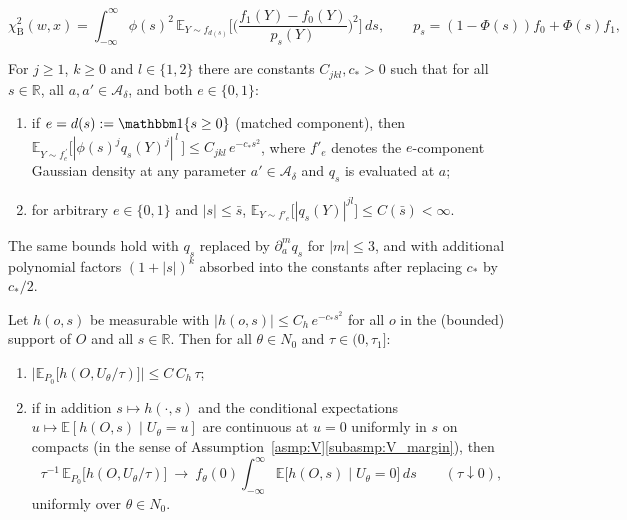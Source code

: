 \documentclass[10pt,a4paper]{amsart}
\newcommand{\E}{\mathbb{E}}
\newcommand{\R}{\mathbb{R}}
\begin{document}
\begin{equation}
\chi^2_{\mathrm B}(w,x)=\int_{-\infty}^{\infty}\phi(s)^2\,
\E_{Y\sim f_{d(s)}}\Bigg[\bigg(\frac{f_1(Y)-f_0(Y)}{p_s(Y)}\bigg)^{\!2}\Bigg]\,ds,
\qquad
p_s=(1-\Phi(s))f_0+\Phi(s)f_1,
\label{eq:chisq_weight}
\end{equation}

\begin{lemma}
\label{lem:gate_factor_moments}
For $j\ge1$, $k\ge0$ and $l\in\{1,2\}$ there are constants $C_{jkl},c_*>0$ such that for all $s\in\R$, all $a,a'\in\mathcal A_\delta$, and both $e\in\{0,1\}$:
\begin{enumerate}[label=(\roman*),nosep]
\item\label{gfm:matched} if $e=d(s):=\mathbbm 1\{s\ge0\}$ (matched component), then
$\E_{Y\sim f^{\,\prime}_{e}}\big[|\phi(s)^jq_s(Y)^j|^{\,l}\,\big]\le C_{jkl}\,e^{-c_*s^2}$,
where $f'_e$ denotes the $e$-component Gaussian density at any parameter $a'\in\mathcal A_\delta$ and $q_s$ is evaluated at $a$;
\item\label{gfm:mismatched} for arbitrary $e\in\{0,1\}$ and $|s|\le\bar s$,
$\E_{Y\sim f'_{e}}\big[|q_s(Y)|^{jl}\big]\le C(\bar s)<\infty$.
\end{enumerate}
The same bounds hold with $q_s$ replaced by $\partial_a^mq_s$ for $|m|\le3$, and with additional polynomial factors $(1+|s|)^k$ absorbed into the constants after replacing $c_*$ by $c_*/2$.
\end{lemma}

\begin{lemma}
\label{lem:boundary_layer_integration}
Let $h(o,s)$ be measurable with $|h(o,s)|\le C_h\,e^{-c_*s^2}$ for all $o$ in the (bounded) support of $O$ and all $s\in\R$. Then for all $\theta\in N_0$ and $\tau\in(0,\tau_1]$:
\begin{enumerate}[label=(\roman*),nosep]
\item $\big|\E_{P_0}\big[h(O,U_\theta/\tau)\big]\big|\le C\,C_h\,\tau$;
\item if in addition $s\mapsto h(\cdot,s)$ and the conditional expectations $u\mapsto\E[h(O,s)\mid U_\theta=u]$ are continuous at $u=0$ uniformly in $s$ on compacts (in the sense of Assumption~\ref{asmp:V}\ref{subasmp:V_margin}), then
\[
\tau^{-1}\,\E_{P_0}\big[h(O,U_\theta/\tau)\big]\ \longrightarrow\ f_\theta(0)\int_{-\infty}^{\infty}\E\big[h(O,s)\mid U_\theta=0\big]\,ds
\qquad(\tau\downarrow0),
\]
uniformly over $\theta\in N_0$.
\end{enumerate}
\end{lemma}
\end{document}
